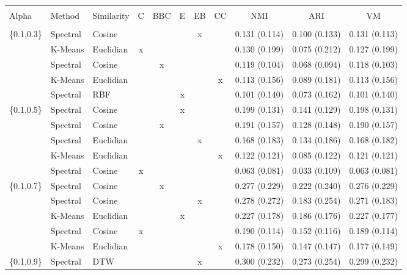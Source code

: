 \documentclass[12pt,a4paper,bibliography=totocnumbered,listof=totocnumbered]{scrartcl}
\begin{document}
\begin{appendix}
\begin{table}[!htbp] \centering 
	\label{} 
	\scriptsize
	\begin{tabularx}{\textwidth}{ lllcccccccc} \\
		\\[-1.8ex]	\toprule
		\\[-1.8ex] 
		Alpha & Method & Similarity & C & BBC & E & EB & CC & NMI & ARI & VM \\ 
		\hline \\[-1.8ex] 
	\{0.1,0.3\} & Spectral & Cosine &  &  &  & x &  & 0.131 (0.114) & 0.100 (0.133) & 0.131 (0.113) \\ 
	& K-Means & Euclidian & x &  &  &  &  & 0.130 (0.199) & 0.075 (0.212) & 0.127 (0.199) \\ 
	& Spectral & Cosine &  & x &  &  &  & 0.119 (0.104) & 0.068 (0.094) & 0.118 (0.103) \\ 
	& K-Means & Euclidian &  &  &  &  & x & 0.113 (0.156) & 0.089 (0.181) & 0.113 (0.156) \\ 
	& Spectral & RBF &  &  & x &  &  & 0.101 (0.140) & 0.073 (0.162) & 0.101 (0.140) \\ 
	\{0.1,0.5\} & Spectral & Cosine &  &  & x &  &  & 0.199 (0.131) & 0.141 (0.129) & 0.198 (0.131) \\ 
	& Spectral & Cosine &  & x &  &  &  & 0.191 (0.157) & 0.128 (0.148) & 0.190 (0.157) \\ 
	& Spectral & Euclidian &  &  &  & x &  & 0.168 (0.183) & 0.134 (0.186) & 0.168 (0.182) \\ 
	& K-Means & Euclidian &  &  &  &  & x & 0.122 (0.121) & 0.085 (0.122) & 0.121 (0.121) \\ 
	& Spectral & Cosine & x &  &  &  &  & 0.063 (0.081) & 0.033 (0.109) & 0.063 (0.081) \\ 
	\{0.1,0.7\} & Spectral & Cosine &  & x &  &  &  & 0.277 (0.229) & 0.222 (0.240) & 0.276 (0.229) \\ 
	& Spectral & Cosine &  &  &  & x &  & 0.278 (0.272) & 0.183 (0.254) & 0.271 (0.183) \\ 
	& K-Means & Euclidian &  &  & x &  &  & 0.227 (0.178) & 0.186 (0.176) & 0.227 (0.177) \\ 
	& Spectral & Cosine & x &  &  &  &  & 0.190 (0.114) & 0.152 (0.116) & 0.189 (0.114) \\ 
	& K-Means & Euclidian &  &  &  &  & x & 0.178 (0.150) & 0.147 (0.147) & 0.177 (0.149) \\ 
	\{0.1,0.9\} & Spectral & DTW &  &  &  & x &  & 0.300 (0.232) & 0.273 (0.254) & 0.299 (0.232) \\ 

\end{tabularx}
\end{table}
\end{appendix}
\end{document}
